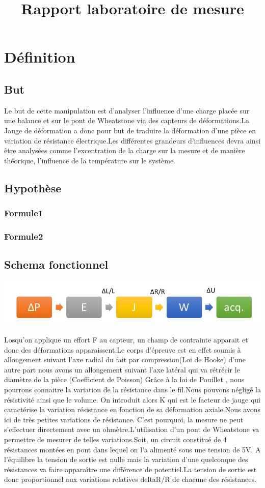 \documentclass[11pt,a4paper]{report}
\begin{document}
\title{Rapport laboratoire de mesure}
\chapter{Définition}	
\section{But}

Le but de cette manipulation est d'analyser l'influence d'une charge placée sur une balance et sur le pont de Wheatstone via des capteurs de déformations.La Jauge de déformation a donc pour but de traduire la déformation d'une pièce en variation de résistance électrique.Les différentes grandeurs d'influences devra ainsi être analysées comme l'excentration de la charge sur la mesure et de manière théorique, l'influence de la température sur le système.
\section{Hypothèse}

\subsection{Formule1}
\subsection{Formule2}
\section{Schema fonctionnel}
\begin{center}
\includegraphics[scale=0.5]{image1.jpg} 
\end{center}

Losqu'on applique un effort F au capteur, un champ de contrainte apparait et donc des déformations apparaissent.Le corps d'épreuve est en effet soumis à allongement suivant l'axe radial du fait par compression(Loi de Hooke) d'une autre part nous avons un allongement suivant l'axe latéral qui va rétrécir le diamètre de la pièce (Coefficient de Poisson) Grâce à la loi de Pouillet , nous pourrons connaitre la variation de la résistance dans le fil.Nous pouvons négligé la résistivité ainsi que le volume. On introduit alors K qui est le facteur de jauge qui caractérise la variation résistance en fonction de sa déformation axiale.Nous avons ici de très petites variations de résistance.
C'est pourquoi, la mesure ne peut s'effectuer directement avec un ohmètre.L'utilisation d'un pont de Wheatstone va permettre de mesurer de telles variations.Soit, un circuit constitué de 4 résistances montées en pont dans lequel on l'a alimenté sous une tension de 5V. A l'équilibre la tension de sortie est nulle mais la variation d'une quelconque des résistances va faire apparaître une différence de potentiel.La tension de sortie est donc proportionnel aux variations relatives deltaR/R de chacune des résistances. 
\end{document}
